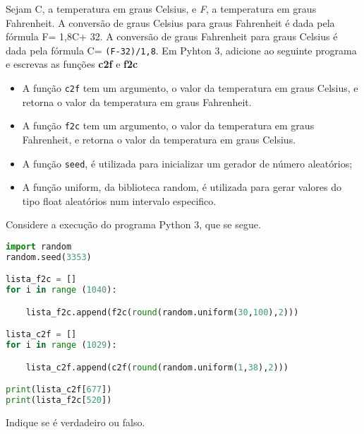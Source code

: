 \documentclass[12pt,varwidth=16cm,border=17pt]{standalone}
\begin{document}
Sejam C, a temperatura em graus Celsius, e \emph{F}, a temperatura em graus Fahrenheit. A conversão de graus Celsius para graus Fahrenheit é dada pela fórmula F= 1,8C+ 32. A conversão de graus Fahrenheit para graus Celsius é dada pela fórmula C= \verb+(F-32)/1,8+.
Em Pyhton 3, adicione ao seguinte programa e escrevas as funções \textbf{c2f} e \textbf{f2c} 


\begin{itemize}
    
  \item A função \verb+c2f+ tem um argumento, o valor da temperatura em graus Celsius, e retorna o valor da temperatura em graus Fahrenheit.
  
  \item  A função \verb+f2c+ tem um argumento, o valor da temperatura em graus Fahrenheit, e retorna o valor da temperatura em graus Celsius.

  \item A função \verb+seed+, é utilizada para inicializar um gerador de número aleatórios;
  
  \item A função uniform, da biblioteca random, é utilizada para gerar valores do tipo float aleatórios num intervalo especifico.

    
\end{itemize}




Considere a execução do programa Python 3, que se segue. 

\begin{lstlisting}[language=Python]
import random
random.seed(3353)

lista_f2c = []
for i in range (1040):

    lista_f2c.append(f2c(round(random.uniform(30,100),2)))

lista_c2f = []
for i in range (1029):

    lista_c2f.append(c2f(round(random.uniform(1,38),2)))

print(lista_c2f[677])
print(lista_f2c[520])
\end{lstlisting}

Indique se é verdadeiro ou falso.
\end{document}
